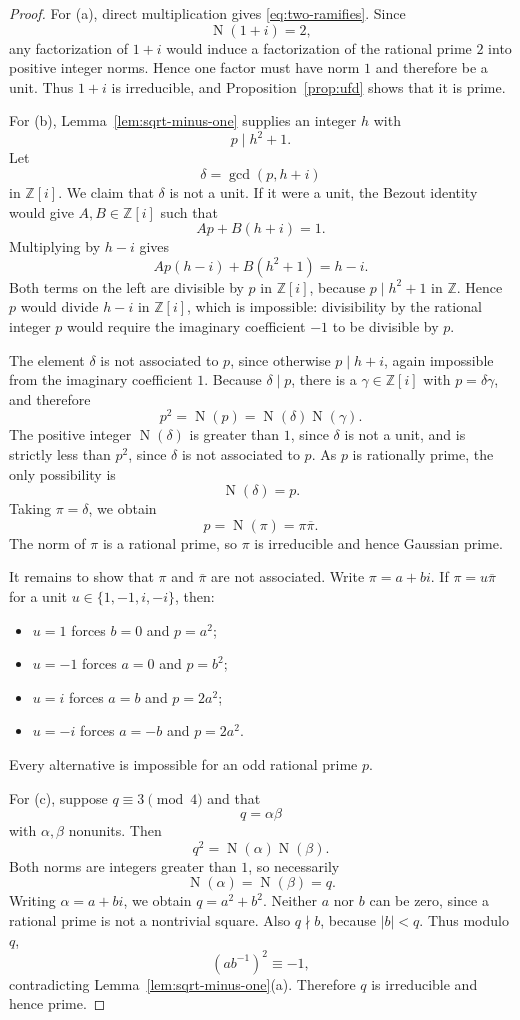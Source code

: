\documentclass[11pt,a4paper]{article}
\numberwithin{equation}{section}
\theoremstyle{definition}
\theoremstyle{remark}
\newcommand{\Z}{\mathbb Z}
\newcommand{\Zi}{\Z[i]}
\newcommand{\Norm}{\operatorname{N}}
\newcommand{\divides}{\mathrel{|}}
\newcommand{\ndivides}{\mathrel{\nmid}}
\begin{document}
\begin{proof}
For (a), direct multiplication gives \eqref{eq:two-ramifies}. Since
\[
 \Norm(1+i)=2,
\]
any factorization of $1+i$ would induce a factorization of the rational prime $2$ into positive integer norms. Hence one factor must have norm $1$ and therefore be a unit. Thus $1+i$ is irreducible, and Proposition~\ref{prop:ufd} shows that it is prime.

For (b), Lemma~\ref{lem:sqrt-minus-one} supplies an integer $h$ with
\[
 p\divides h^2+1.
\]
Let
\[
 \delta=\gcd(p,h+i)
\]
in $\Zi$. We claim that $\delta$ is not a unit. If it were a unit, the Bezout identity would give $A,B\in\Zi$ such that
\[
 Ap+B(h+i)=1.
\]
Multiplying by $h-i$ gives
\[
 Ap(h-i)+B(h^2+1)=h-i.
\]
Both terms on the left are divisible by $p$ in $\Zi$, because $p\divides h^2+1$ in $\Z$. Hence $p$ would divide $h-i$ in $\Zi$, which is impossible: divisibility by the rational integer $p$ would require the imaginary coefficient $-1$ to be divisible by $p$.

The element $\delta$ is not associated to $p$, since otherwise $p\divides h+i$, again impossible from the imaginary coefficient $1$. Because $\delta\divides p$, there is a $\gamma\in\Zi$ with $p=\delta\gamma$, and therefore
\[
 p^2=\Norm(p)=\Norm(\delta)\Norm(\gamma).
\]
The positive integer $\Norm(\delta)$ is greater than $1$, since $\delta$ is not a unit, and is strictly less than $p^2$, since $\delta$ is not associated to $p$. As $p$ is rationally prime, the only possibility is
\[
 \Norm(\delta)=p.
\]
Taking $\pi=\delta$, we obtain
\[
 p=\Norm(\pi)=\pi\overline\pi.
\]
The norm of $\pi$ is a rational prime, so $\pi$ is irreducible and hence Gaussian prime.

It remains to show that $\pi$ and $\overline\pi$ are not associated. Write $\pi=a+bi$. If $\pi=u\overline\pi$ for a unit $u\in\{1,-1,i,-i\}$, then:
\begin{itemize}
 \item $u=1$ forces $b=0$ and $p=a^2$;
 \item $u=-1$ forces $a=0$ and $p=b^2$;
 \item $u=i$ forces $a=b$ and $p=2a^2$;
 \item $u=-i$ forces $a=-b$ and $p=2a^2$.
\end{itemize}
Every alternative is impossible for an odd rational prime $p$.

For (c), suppose $q\equiv3\pmod4$ and that
\[
 q=\alpha\beta
\]
with $\alpha,\beta$ nonunits. Then
\[
 q^2=\Norm(\alpha)\Norm(\beta).
\]
Both norms are integers greater than $1$, so necessarily
\[
 \Norm(\alpha)=\Norm(\beta)=q.
\]
Writing $\alpha=a+bi$, we obtain $q=a^2+b^2$. Neither $a$ nor $b$ can be zero, since a rational prime is not a nontrivial square. Also $q\ndivides b$, because $|b|<q$. Thus modulo $q$,
\[
 (ab^{-1})^2\equiv-1,
\]
contradicting Lemma~\ref{lem:sqrt-minus-one}(a). Therefore $q$ is irreducible and hence prime.
\end{proof}
\end{document}
